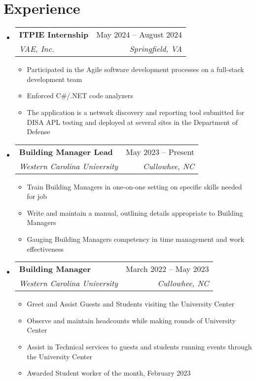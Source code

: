\documentclass[letterpaper,11pt]{article}
\makeatletter
\newcommand{\resumeItem}[1]{
  \item\small{
    {#1 \vspace{-2pt}}
  }
}
\newcommand{\resumeSubheading}[4]{
  \vspace{-2pt}\item
    \begin{tabular*}{0.97\textwidth}[t]{l@{\extracolsep{\fill}}r}
      \textbf{#1} & #2 \\
      \textit{\small#3} & \textit{\small #4} \\
    \end{tabular*}\vspace{-7pt}
}
\newcommand{\resumeSubSubheading}[2]{
    \item
    \begin{tabular*}{0.97\textwidth}{l@{\extracolsep{\fill}}r}
      \textit{\small#1} & \textit{\small #2} \\
    \end{tabular*}\vspace{-7pt}
}
\newcommand{\resumeSubHeadingListStart}{\begin{itemize}[leftmargin=0.15in, label={}]}
\newcommand{\resumeSubHeadingListEnd}{\end{itemize}}
\newcommand{\resumeItemListStart}{\begin{itemize}}
\newcommand{\resumeItemListEnd}{\end{itemize}\vspace{-5pt}}
\makeatother
\begin{document}
\section{Experience}
  \resumeSubHeadingListStart

    \resumeSubheading
      {ITPIE Internship}{May 2024 -- August 2024}
      {VAE, Inc.}{Springfield, VA}
      \resumeItemListStart
        \resumeItem{Participated in the Agile software development processes on a full-stack development team}
        \resumeItem{Enforced C\#/.NET code analyzers}
        \resumeItem{The application is a network discovery and reporting tool submitted for DISA APL testing and deployed at several sites in the Department of Defense}
      \resumeItemListEnd
      

    \resumeSubheading
      {Building Manager Lead}{May 2023 – Present}
      {Western Carolina University}{Cullowhee, NC}
      \resumeItemListStart
        \resumeItem{Train Building Managers in one-on-one setting on specific skills needed for job}
        \resumeItem{Write and maintain a manual, outlining details appropriate to Building Managers}
        \resumeItem{Gauging Building Managers competency in time management and work effectiveness}
    \resumeItemListEnd

    \resumeSubheading
      {Building Manager}{March 2022 – May 2023}
      {Western Carolina University}{Cullowhee, NC}
      \resumeItemListStart
        \resumeItem{Greet and Assist Guests and Students visiting the University Center}
        \resumeItem{Observe and maintain headcounts while making rounds of University Center}
        \resumeItem{Assist in Technical services to guests and students running events through the University Center}
        \resumeItem{Awarded Student worker of the month, February 2023}
      \resumeItemListEnd

  \resumeSubHeadingListEnd


\end{document}
